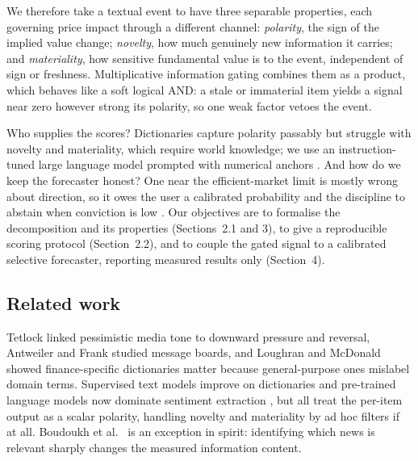 \documentclass[12pt,a4paper]{article}
\begin{document}
We therefore take a textual event to have three separable properties, each governing
price impact through a different channel: \emph{polarity}, the sign of the implied
value change; \emph{novelty}, how much genuinely new information it carries; and
\emph{materiality}, how sensitive fundamental value is to the event, independent of
sign or freshness. Multiplicative information gating combines them as a product,
which behaves like a soft logical AND: a stale or immaterial item yields a signal
near zero however strong its polarity, so one weak factor vetoes the event.

Who supplies the scores? Dictionaries capture polarity passably
\cite{loughran2011} but struggle with novelty and materiality, which require world
knowledge; we use an instruction-tuned large language model prompted with numerical
anchors \cite{brown2020,lopezlira2023}. And how do we keep the forecaster honest?
One near the efficient-market limit \cite{fama1970} is mostly wrong about direction,
so it owes the user a calibrated probability and the discipline to abstain when
conviction is low \cite{chow1970,geifman2017}. Our objectives are to formalise the
decomposition and its properties (Sections~2.1 and 3), to give a reproducible
scoring protocol (Section~2.2), and to couple the gated signal to a calibrated
selective forecaster, reporting measured results only (Section~4).

\subsection{Related work}

Tetlock \cite{tetlock2007} linked pessimistic media tone to downward pressure and
reversal, Antweiler and Frank \cite{antweiler2004} studied message boards, and
Loughran and McDonald \cite{loughran2011} showed finance-specific dictionaries
matter because general-purpose ones mislabel domain terms. Supervised text models
improve on dictionaries \cite{ke2019} and pre-trained language models now dominate
sentiment extraction \cite{huang2023}, but all treat the per-item output as a scalar
polarity, handling novelty and materiality by ad hoc filters if at all. Boudoukh et
al.\ \cite{boudoukh2019} is an exception in spirit: identifying which news is
relevant sharply changes the measured information content.
\end{document}
